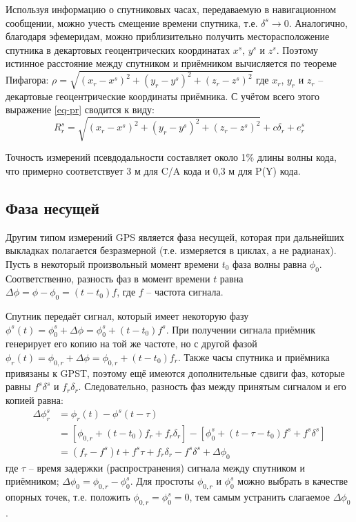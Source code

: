 Используя информацию о спутниковых часах, передаваемую в навигационном сообщении, можно учесть смещение времени спутника, т.е. $\delta^s\rightarrow 0$.
Аналогично, благодаря эфемеридам, можно приблизительно получить месторасположение спутника в декартовых геоцентрических координатах $x^s$, $y^s$ и $z^s$.
Поэтому истинное расстояние между спутником и приёмником вычисляется по теореме Пифагора: $\rho=\sqrt{(x_r-x^s)^2+(y_r-y^s)^2+(z_r-z^s)^2}$ где $x_r$, $y_r$ и $z_r$ -- декартовые геоцентрические координаты приёмника.
С учётом всего этого выражение \eqref{eq-pr} сводится к виду: 
\begin{equation}
\label{eq-pr2}
R_r^s=\sqrt{(x_r-x^s)^2+(y_r-y^s)^2+(z_r-z^s)^2}+c\delta_r+e_r^s    
\end{equation}

Точность измерений псевдодальности составляет около 1\% длины волны кода, что примерно соответствует 3 м для C/A кода и 0,3 м для P(Y) кода.

\subsection*{\textbf{Фаза несущей}}

Другим типом измерений GPS является фаза несущей, которая при дальнейших выкладках полагается безразмерной (т.е. измеряется в циклах, а не радианах).
Пусть в некоторый произвольный момент времени $t_0$ фаза волны равна $\phi_0$.
Соответственно, разность фаз в момент времени $t$ равна $\Delta \phi=\phi-\phi_0=(t-t_0)f$, где $f$ -- частота сигнала.  

Спутник передаёт сигнал, который имеет некоторую фазу $\phi^s(t)=\phi_0^s+\Delta \phi=\phi_0^s+(t-t_0)f^s$.
При получении сигнала приёмник генерирует его копию на той же частоте, но с другой фазой $\phi_r(t)=\phi_{0,r}+\Delta \phi=\phi_{0,r}+(t-t_0)f_r$.
Также часы спутника и приёмника привязаны к GPST, поэтому ещё имеются дополнительные сдвиги фаз, которые равны $f^s\delta^s$ и $f_r\delta_r$.
Следовательно, разность фаз между принятым сигналом и его копией равна:
\begin{equation}
\label{eq-dphi}
\begin{aligned}
\Delta \phi_r^s&=\phi_r(t)-\phi^s(t-\tau) \\
&=\left[\phi_{0,r}+(t-t_0)f_r+f_r\delta_r\right]-\left[\phi_0^s+(t-\tau-t_0)f^s+f^s\delta^s\right] \\
&=(f_r-f^s)t+f^s\tau+f_r\delta_r-f^s\delta^s+\Delta\phi_0
\end{aligned}
\end{equation}
где 
$\tau$ -- время задержки (распространения) сигнала между спутником и приёмником;
$\Delta\phi_0=\phi_{0,r}-\phi_0^s$.
Для простоты $\phi_{0,r}$ и $\phi_0^s$ можно выбрать в качестве опорных точек, т.е. положить $\phi_{0,r}=\phi_0^s=0$, тем самым устранить слагаемое $\Delta\phi_0$.

